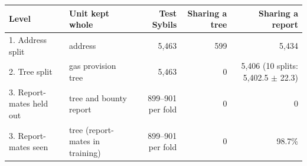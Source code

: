 \begin{tabular}{llrrr}
\toprule
Level & Unit kept whole & Test Sybils & Sharing a tree & Sharing a report \\
\midrule
1. Address split & address & 5,463 & 599 & 5,434 \\
2. Tree split & gas provision tree & 5,463 & 0 & 5,406 (10 splits: 5,402.5 $\pm$ 22.3) \\
3. Report-mates held out & tree and bounty report & 899--901 per fold & 0 & 0 \\
3. Report-mates seen & tree (report-mates in training) & 899--901 per fold & 0 & 98.7\% \\
\bottomrule
\end{tabular}
